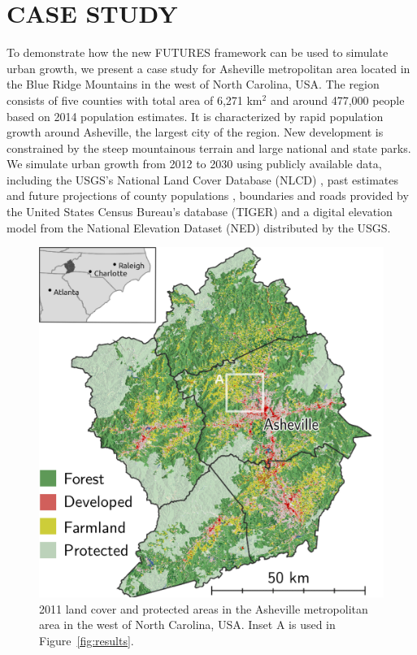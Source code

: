 \documentclass{isprs}
\begin{document}
\section{CASE STUDY}
To demonstrate how the new FUTURES framework
can be used to simulate urban growth,
we present a case study for 
Asheville metropolitan area located in the Blue Ridge Mountains in the west of North Carolina, USA.
The region consists of five counties with total area of 6,271 km$^2$ and around 477,000 people
based on 2014 population estimates.
It is characterized by rapid population growth around Asheville, the largest city of the region.
New development is constrained by the steep mountainous terrain and large national and state parks.
We simulate urban growth from 2012 to 2030 using publicly available data,
including the USGS's National Land Cover Database (NLCD)  \cite{nlcd2011,nlcd2006,nlcd2001,nlcdretro},
past estimates and future projections of county populations \cite{NCOSBM},
boundaries and roads provided by the United States Census Bureau's database (TIGER)
and a digital elevation model from the National Elevation Dataset (NED) distributed by the USGS.

\begin{figure}[h!]
 \centering
 \includegraphics[width=\columnwidth]{./figures/study_area_all.png}
 \caption{2011 land cover \protect\cite{nlcd2011} and protected areas \protect\cite{anderson2011conservation} in the Asheville metropolitan area in the west of North Carolina, USA. Inset A is used in Figure~\ref{fig:results}.}
 \label{fig:study_area}
\end{figure}
\end{document}

